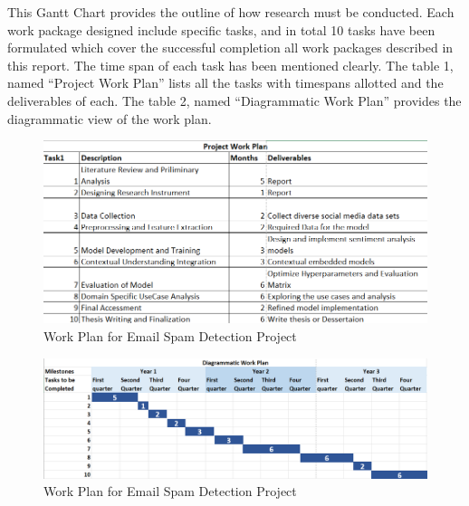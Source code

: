\documentclass[a4paper,onecolumn,11pt]{article}
\begin{document}
This Gantt Chart provides the outline of how research must be conducted. Each work package designed include specific tasks, and in total 10 tasks have been formulated which cover the successful completion all work packages described in this report. The time span of each task has been mentioned clearly. The table 1, named “Project Work Plan” lists all the tasks with timespans allotted and the deliverables of each. The table 2, named “Diagrammatic Work Plan” provides the diagrammatic view of the work plan.

\vspace{15pt}

\begin{figure}[H]
    \centering
    \includegraphics[width=\linewidth]{./workPlan1.png}
    \caption{Work Plan for Email Spam Detection Project}
    \label{fig:workPlan}
\end{figure}

\vspace{15pt}
\begin{figure}[H]
    \centering
    \includegraphics[width=\linewidth]{./workPlan2.png}
    \caption{Work Plan for Email Spam Detection Project}
    \label{fig:workPlan}
\end{figure}
\end{document}

